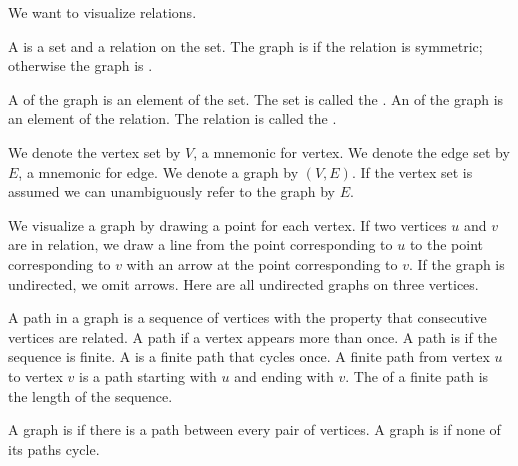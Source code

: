 \sbasic


\sstart



We want to visualize relations.


A  is a set and a relation
on the set.
The graph is 
if the relation is symmetric; otherwise the
graph is .

A  of the graph is an element
of the set.
The set is called the .
An  of the graph is an element of
the relation.
The relation is called the .



We denote the vertex set by $V$, a mnemonic for
vertex.
We denote the edge set by $E$, a mnemonic for
edge.
We denote a graph by $(V, E)$.
If the vertex set is assumed we can
unambiguously refer to the graph by $E$.


We visualize a graph by drawing a
point for each vertex.
If two vertices $u$ and $v$ are in relation,
we draw a line from the point corresponding
to $u$ to the point corresponding to $v$ with
an arrow at the point corresponding to $v$.
If the graph is undirected, we omit arrows.
Here are all undirected graphs on three
vertices.



A path in a graph is a sequence of
vertices with the property that
consecutive vertices are related.
A path  if a vertex
appears more than once.
A path is  if the
sequence is finite.
A  is a finite path
that cycles once.
A finite path from vertex $u$ to vertex $v$
is a path starting with $u$ and
ending with $v$.
The  of a finite path is
the length of the sequence.


A graph is 
if there is a path between every pair
of vertices. A graph is
 if none of its
paths cycle.


\strats

